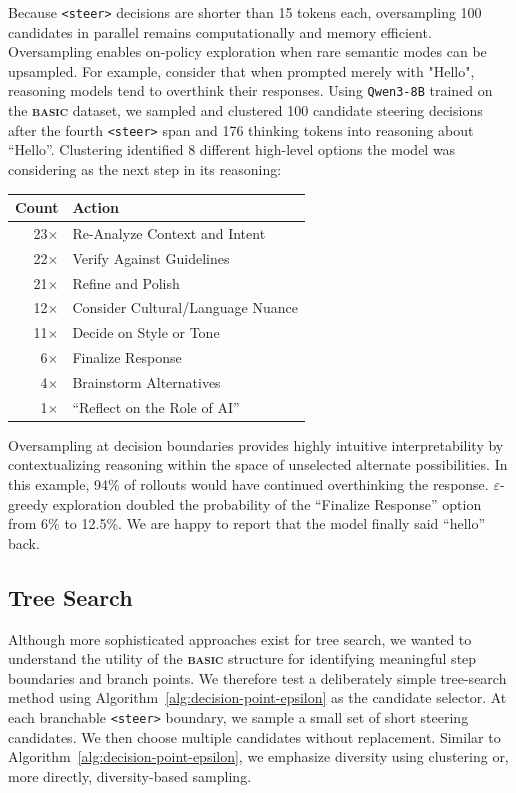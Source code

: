\documentclass[10pt,twocolumn]{article}
\newcommand{\methodname}{\textbf{\textsf{\textsc{basic}}}}
\newcommand{\methodname}{{\sffamily\bfseries{\fontsize{0.95em}{0.95em}\selectfont BASIC}}}
\begin{document}
Because \texttt{<steer>} decisions are shorter than 15 tokens each,
oversampling 100 candidates in parallel remains computationally and memory efficient.
Oversampling enables on-policy exploration when rare semantic modes can be upsampled.
For example, consider that when prompted merely with "Hello", reasoning models tend to
overthink their responses. Using \texttt{Qwen3-8B} trained on the
\methodname{} dataset, we sampled and clustered 100 candidate steering
decisions
after the fourth \texttt{<steer>} span and 176 thinking tokens into
reasoning about
``Hello''. Clustering identified 8 different high-level options
the model was considering as the next step in its reasoning:

\begin{table}[H]
  \centering
  \begin{tabular}{r l}
    \hline
    Count        & Action                            \\
    \hline
    23\(\times\) & Re-Analyze Context and Intent     \\
    22\(\times\) & Verify Against Guidelines         \\
    21\(\times\) & Refine and Polish                 \\
    12\(\times\) & Consider Cultural/Language Nuance \\
    11\(\times\) & Decide on Style or Tone           \\
    6\(\times\)  & Finalize Response                 \\
    4\(\times\)  & Brainstorm Alternatives           \\
    1\(\times\)  & ``Reflect on the Role of AI''     \\
    \hline
  \end{tabular}
\end{table}

Oversampling at decision boundaries provides highly intuitive interpretability by
contextualizing reasoning within the space of unselected alternate possibilities.
In this example, 94\% of rollouts would have continued overthinking the response.
\(\varepsilon\)-greedy exploration doubled the probability of the ``Finalize
Response'' option from 6\% to 12.5\%. We are happy to report that the model finally
said ``hello'' back.

\subsection{Tree Search}

Although more sophisticated approaches exist for tree search, we wanted to
understand the utility of the \methodname{} structure for identifying
meaningful step boundaries and branch points. We therefore test a deliberately
simple tree-search method using Algorithm~\ref{alg:decision-point-epsilon} as
the candidate selector. At each branchable \texttt{<steer>} boundary, we
sample a small set of short steering candidates. We then choose multiple candidates
without replacement. Similar to Algorithm~\ref{alg:decision-point-epsilon}, we
emphasize diversity using clustering or, more directly, diversity-based sampling.
\end{document}

